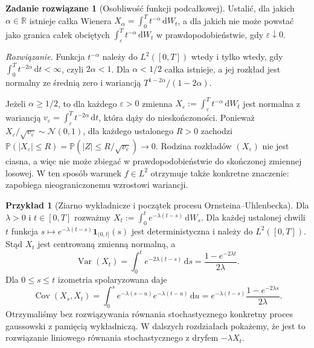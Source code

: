 \documentclass[11pt,a4paper,oneside]{report}
\numberwithin{equation}{chapter}
\theoremstyle{plain}
\theoremstyle{definition}
\newtheorem{przyklad}{Przykład}[chapter]
\newtheorem{zadanie}{Zadanie rozwiązane}[chapter]
\theoremstyle{remark}
\newcommand{\R}{\mathbb{R}}
\newcommand{\Prob}{\mathbb{P}}
\newcommand{\Var}{\operatorname{Var}}
\newcommand{\Cov}{\operatorname{Cov}}
\newcommand{\ind}[1]{\mathbf{1}_{#1}}
\newcommand{\dd}{\mathrm{d}}
\newcommand{\Normal}{\mathcal{N}}
\begin{document}
\begin{zadanie}[Osobliwość funkcji podcałkowej]
Ustalić, dla jakich $\alpha\in\R$ istnieje całka Wienera
$X_\alpha=\int_0^Tt^{-\alpha}\,\dd W_t$, a dla jakich
nie może powstać jako granica całek obciętych
$\int_\varepsilon^Tt^{-\alpha}\,\dd W_t$
w prawdopodobieństwie, gdy $\varepsilon\downarrow0$.

\emph{Rozwiązanie.} Funkcja $t^{-\alpha}$ należy do
$L^2([0,T])$ wtedy i tylko wtedy, gdy
$\int_0^Tt^{-2\alpha}\,\dd t<\infty$, czyli
$2\alpha<1$. Dla $\alpha<1/2$ całka istnieje,
a jej rozkład jest normalny ze średnią zero i wariancją
$T^{1-2\alpha}/(1-2\alpha)$.

Jeżeli $\alpha\ge1/2$, to dla każdego $\varepsilon>0$
zmienna $X_\varepsilon:=\int_\varepsilon^T t^{-\alpha}\,\dd W_t$
jest normalna z wariancją
$v_\varepsilon=\int_\varepsilon^Tt^{-2\alpha}\,\dd t$,
która dąży do nieskończoności. Ponieważ
$X_\varepsilon/\sqrt{v_\varepsilon}\sim\Normal(0,1)$,
dla każdego ustalonego $R>0$ zachodzi
$\Prob(|X_\varepsilon|\le R)
=\Prob(|Z|\le R/\sqrt{v_\varepsilon})\to0$.
Rodzina rozkładów $(X_\varepsilon)$ nie jest ciasna,
a więc nie może zbiegać w prawdopodobieństwie do
skończonej zmiennej losowej. W ten sposób warunek
$f\in L^2$ otrzymuje także konkretne znaczenie:
zapobiega nieograniczonemu wzrostowi wariancji.
\end{zadanie}

\begin{przyklad}[Ziarno wykładnicze i początek procesu Ornsteina--Uhlenbecka]
Dla $\lambda>0$ i $t\in[0,T]$ rozważmy
$X_t:=\int_0^te^{-\lambda(t-s)}\,\dd W_s$.
Dla każdej ustalonej chwili $t$ funkcja
$s\mapsto e^{-\lambda(t-s)}\ind{(0,t]}(s)$
jest deterministyczna i należy do $L^2([0,T])$.
Stąd $X_t$ jest centrowaną zmienną normalną, a
\[
\Var(X_t)=\int_0^te^{-2\lambda(t-s)}\,\dd s
=\frac{1-e^{-2\lambda t}}{2\lambda}.
\]
Dla $0\le s\le t$ izometria spolaryzowana daje
\[
\Cov(X_s,X_t)
=\int_0^s e^{-\lambda(s-u)}e^{-\lambda(t-u)}\,\dd u
=e^{-\lambda(t-s)}\frac{1-e^{-2\lambda s}}{2\lambda}.
\]
Otrzymaliśmy bez rozwiązywania równania stochastycznego
konkretny proces gaussowski z pamięcią wykładniczą.
W dalszych rozdziałach pokażemy, że jest to rozwiązanie
liniowego równania stochastycznego z dryfem
$-\lambda X_t$.
\end{przyklad}
\end{document}
